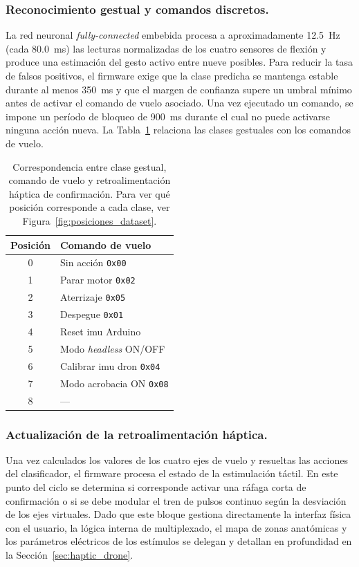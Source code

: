 \documentclass[12pt]{article}
\begin{document}
\subsubsection{Reconocimiento gestual y comandos discretos.}
La red neuronal \textit{fully-connected} embebida procesa a aproximadamente 12.5~Hz (cada 80.0~ms) las lecturas normalizadas de los cuatro sensores de flexión y produce una estimación del gesto activo entre nueve posibles. Para reducir la tasa de falsos positivos, el firmware exige que la clase predicha se mantenga estable durante al menos 350~ms y que el margen de confianza supere un umbral mínimo antes de activar el comando de vuelo asociado. Una vez ejecutado un comando, se impone un período de bloqueo de 900~ms durante el cual no puede activarse ninguna acción nueva. La Tabla~\ref{tab:nn_gestos} relaciona las clases gestuales con los comandos de vuelo.

\begin{table}[htbp]
\centering
\caption[Correspondencia entre clase gestual, comando de vuelo y retroalimentación háptica de confirmación]{Correspondencia entre clase gestual, comando de vuelo y retroalimentación háptica de confirmación. Para ver qué posición corresponde a cada clase, ver Figura~\ref{fig:posiciones_dataset}.}
\label{tab:nn_gestos}
\begin{tabular}{cl}
\hline
\textbf{Posición} & \textbf{Comando de vuelo} \\
\hline
0 & Sin acción \texttt{0x00}\\
1 & Parar motor \texttt{0x02}\\
2 & Aterrizaje \texttt{0x05}\\
3 & Despegue \texttt{0x01}\\
4 & Reset \gls{imu} Arduino\\
5 & Modo \textit{headless} ON/OFF\\
6 & Calibrar \gls{imu} dron \texttt{0x04} \\
7 & Modo acrobacia ON \texttt{0x08}\\
8 & --- \\
\hline
\end{tabular}
\end{table}

\subsubsection{Actualización de la retroalimentación háptica.}
Una vez calculados los valores de los cuatro ejes de vuelo y resueltas las acciones del clasificador, el firmware procesa el estado de la estimulación táctil. En este punto del ciclo se determina si corresponde activar una ráfaga corta de confirmación o si se debe modular el tren de pulsos continuo según la desviación de los ejes virtuales. Dado que este bloque gestiona directamente la interfaz física con el usuario, la lógica interna de multiplexado, el mapa de zonas anatómicas y los parámetros eléctricos de los estímulos se delegan y detallan en profundidad en la Sección~\ref{sec:haptic_drone}.
\end{document}
